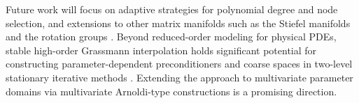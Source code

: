 \documentclass[11pt]{article}
\begin{document}
Future work will focus on adaptive strategies for polynomial degree and node selection, and extensions to other matrix manifolds such as the Stiefel manifolds and the rotation groups \cite{zimmermann2017matrix, zimmermann2022computing, massart2020quotient}. Beyond reduced-order modeling for physical PDEs, stable high-order Grassmann interpolation holds significant potential for constructing parameter-dependent preconditioners and coarse spaces in two-level stationary iterative methods \cite{ciaramella2024gentle}. Extending the approach to multivariate parameter domains via multivariate Arnoldi-type constructions \cite{zhang2025multivariate, zhu2025convergence} is a promising direction.



\end{document}

